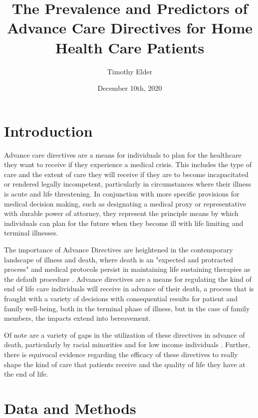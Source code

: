 \documentclass{article}
\title{The Prevalence and Predictors of Advance Care Directives for Home Health Care Patients}
\author{Timothy Elder}
\date{December 10th, 2020}
\begin{document}
\maketitle

\section{Introduction}

Advance care directives are a means for individuals to plan for the healthcare they want to receive if they experience a medical crisis. This includes the type of care and the extent of care they will receive if they are to become incapacitated or rendered legally incompetent, particularly in circumstances where their illness is acute and life threatening. In conjunction with more specific provisions for medical decision making, such as designating a medical proxy or representative with durable power of attorney, they represent the principle means by which individuals can plan for the future when they become ill with life limiting and terminal illnesses. 

The importance of Advance Directives are heightened in the contemporary landscape of illness and death, where death is an "expected and protracted process" \cite{carr_well-being_2019} and medical protocols persist in maintaining life sustaining therapies as the default procedure \cite{timmermans_sudden_1999}. Advance directives are a means for regulating the kind of end of life care individuals will receive in advance of their death, a process that is fraught with a variety of decisions with consequential results for patient and family well-being, both in the terminal phase of illness, but in the case of family members, the impacts extend into bereavement. 

Of note are a variety of gaps in the utilization of these directives in advance of death, particularly by racial minorities and for low income individuals \cite{carr_advance_2017, laguna_jeff_racialethnic_2014}. Further, there is equivocal evidence regarding the efficacy of these directives to really shape the kind of care that patients receive and the quality of life they have at the end of life. 

\section{Data and Methods}
\end{document}
